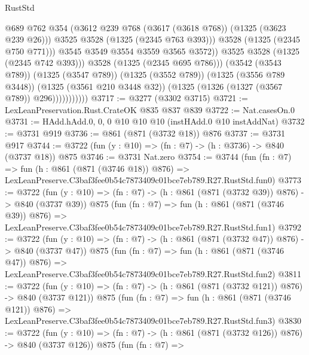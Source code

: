 \begin{lexlean}{RustStd}
\begin{coremodule}
                                  @689
                                  @762
                                  @354
                                  (@3612 @239 @768 (@3617 (@3618 @768)) (@1325 (@3623 @239 @26)))
                                  @3525
                                  @3528
                                  (@1325 (@2345 @763 @393)))
                                @3528
                                (@1325 (@2345 @750 @771)))
                              @3545
                              @3549
                              @3554
                              @3559
                              @3565
                              @3572))
                          @3525
                          @3528
                          (@1325 (@2345 @742 @393)))
                        @3528
                        (@1325 (@2345 @695 @786)))
                      (@3542 (@3543 @789))
                      (@1325 (@3547 @789))
                      (@1325 (@3552 @789))
                      (@1325 (@3556 @789 @3448))
                      (@1325 (@3561 @210 @3448 @32))
                      (@1325 (@1326 (@1327 (@3567 @789)) @296)))))))))))
@3717 := @3277 (@3302 @3715)
@3721 := LexLeanPreservation.Rust.CrateOK @835 @837 @839
@3722 := Nat.casesOn.{0}
@3731 := HAdd.hAdd.{0, 0, 0} @10 @10 @10 (instHAdd.{0} @10 instAddNat)
@3732 := @3731 @919
@3736 := @861 (@871 (@3732 @18)) @876
@3737 := @3731 @917
@3744 := @3722 (fun (y : @10) => (fn : @7) -> (h : @3736) -> @840 (@3737 @18)) @875
@3746 := @3731 Nat.zero
@3754 := @3744
    (fun (fn : @7) =>
    fun (h : @861 (@871 (@3746 @18)) @876) =>
    LexLeanPreserve.C3baf3fee0b54c7873409c01bce7eb789.R27.RustStd.fun0)
@3773 := @3722
    (fun (y : @10) => (fn : @7) -> (h : @861 (@871 (@3732 @39)) @876) -> @840 (@3737 @39))
    @875
    (fun (fn : @7) =>
    fun (h : @861 (@871 (@3746 @39)) @876) =>
    LexLeanPreserve.C3baf3fee0b54c7873409c01bce7eb789.R27.RustStd.fun1)
@3792 := @3722
    (fun (y : @10) => (fn : @7) -> (h : @861 (@871 (@3732 @47)) @876) -> @840 (@3737 @47))
    @875
    (fun (fn : @7) =>
    fun (h : @861 (@871 (@3746 @47)) @876) =>
    LexLeanPreserve.C3baf3fee0b54c7873409c01bce7eb789.R27.RustStd.fun2)
@3811 := @3722
    (fun (y : @10) => (fn : @7) -> (h : @861 (@871 (@3732 @121)) @876) -> @840 (@3737 @121))
    @875
    (fun (fn : @7) =>
    fun (h : @861 (@871 (@3746 @121)) @876) =>
    LexLeanPreserve.C3baf3fee0b54c7873409c01bce7eb789.R27.RustStd.fun3)
@3830 := @3722
    (fun (y : @10) => (fn : @7) -> (h : @861 (@871 (@3732 @126)) @876) -> @840 (@3737 @126))
    @875
    (fun (fn : @7) =>

\end{coremodule}
\end{lexlean}
